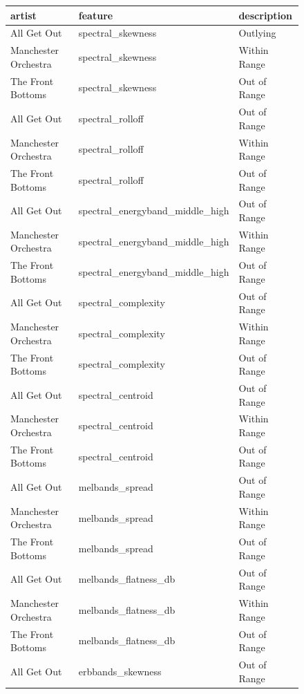 \documentclass{article}\usepackage[]{graphicx}\usepackage[]{xcolor}
\begin{document}
\begin{figure}
\caption{Summary of Features by Artist} %
\label{songtab}
\begin{table}[H]
\centering
\begingroup\tiny
\begin{tabular}{lll}
  \hline
artist & feature & description \\ 
  \hline
All Get Out & spectral\_skewness & Outlying \\ 
  Manchester Orchestra & spectral\_skewness & Within Range \\ 
  The Front Bottoms & spectral\_skewness & Out of Range \\ 
  All Get Out & spectral\_rolloff & Out of Range \\ 
  Manchester Orchestra & spectral\_rolloff & Within Range \\ 
  The Front Bottoms & spectral\_rolloff & Out of Range \\ 
  All Get Out & spectral\_energyband\_middle\_high & Out of Range \\ 
  Manchester Orchestra & spectral\_energyband\_middle\_high & Within Range \\ 
  The Front Bottoms & spectral\_energyband\_middle\_high & Out of Range \\ 
  All Get Out & spectral\_complexity & Out of Range \\ 
  Manchester Orchestra & spectral\_complexity & Within Range \\ 
  The Front Bottoms & spectral\_complexity & Out of Range \\ 
  All Get Out & spectral\_centroid & Out of Range \\ 
  Manchester Orchestra & spectral\_centroid & Within Range \\ 
  The Front Bottoms & spectral\_centroid & Out of Range \\ 
  All Get Out & melbands\_spread & Out of Range \\ 
  Manchester Orchestra & melbands\_spread & Within Range \\ 
  The Front Bottoms & melbands\_spread & Out of Range \\ 
  All Get Out & melbands\_flatness\_db & Out of Range \\ 
  Manchester Orchestra & melbands\_flatness\_db & Within Range \\ 
  The Front Bottoms & melbands\_flatness\_db & Out of Range \\ 
  All Get Out & erbbands\_skewness & Out of Range \\ 

\end{tabular}
\end{table}
\end{figure}
\end{document}

